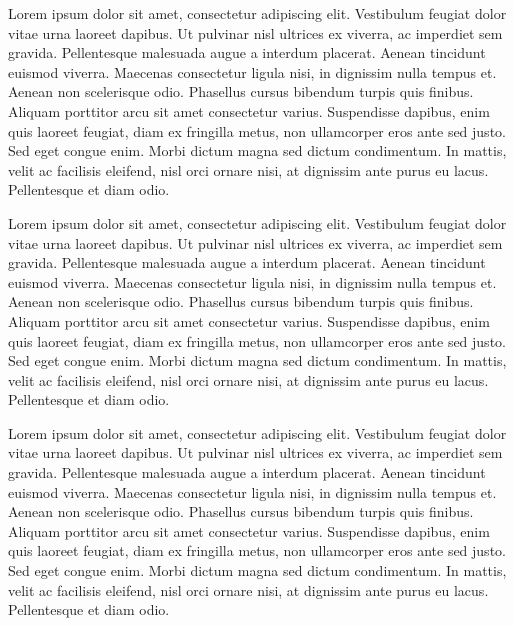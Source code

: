 \documentclass{article}
\begin{document}
\begin{pairs}  
  

\begin{Leftside} 
\resumenumbering  
\pstart  

Lorem ipsum dolor sit amet, consectetur adipiscing elit. Vestibulum feugiat dolor vitae urna laoreet dapibus. Ut pulvinar nisl ultrices ex viverra, ac imperdiet sem gravida. Pellentesque malesuada augue a interdum placerat. Aenean tincidunt euismod viverra. Maecenas consectetur ligula nisi, in dignissim nulla tempus et. Aenean non scelerisque odio. Phasellus cursus bibendum turpis quis finibus. Aliquam porttitor arcu sit amet consectetur varius. Suspendisse dapibus, enim quis laoreet feugiat, diam ex fringilla metus, non ullamcorper eros ante sed justo. Sed eget congue enim. Morbi dictum magna sed dictum condimentum. In mattis, velit ac facilisis eleifend, nisl orci ornare nisi, at dignissim ante purus eu lacus. Pellentesque et diam odio.
\pend  
\pausenumbering 
\end{Leftside}

\begin{Rightside}   
\resumenumbering  
\pstart  
Lorem ipsum dolor sit amet, consectetur adipiscing elit. Vestibulum feugiat dolor vitae urna laoreet dapibus. Ut pulvinar nisl ultrices ex viverra, ac imperdiet sem gravida. Pellentesque malesuada augue a interdum placerat. Aenean tincidunt euismod viverra. Maecenas consectetur ligula nisi, in dignissim nulla tempus et. Aenean non scelerisque odio. Phasellus cursus bibendum turpis quis finibus. Aliquam porttitor arcu sit amet consectetur varius. Suspendisse dapibus, enim quis laoreet feugiat, diam ex fringilla metus, non ullamcorper eros ante sed justo. Sed eget congue enim. Morbi dictum magna sed dictum condimentum. In mattis, velit ac facilisis eleifend, nisl orci ornare nisi, at dignissim ante purus eu lacus. Pellentesque et diam odio.
\pend  
\endnumbering
\end{Rightside} 
\end{pairs}  

\Columns
\resumenumbering  
\pstart  
Lorem ipsum dolor sit amet, consectetur adipiscing elit. Vestibulum feugiat dolor vitae urna laoreet dapibus. Ut pulvinar nisl ultrices ex viverra, ac imperdiet sem gravida. Pellentesque malesuada augue a interdum placerat. Aenean tincidunt euismod viverra. Maecenas consectetur ligula nisi, in dignissim nulla tempus et. Aenean non scelerisque odio. Phasellus cursus bibendum turpis quis finibus. Aliquam porttitor arcu sit amet consectetur varius. Suspendisse dapibus, enim quis laoreet feugiat, diam ex fringilla metus, non ullamcorper eros ante sed justo. Sed eget congue enim. Morbi dictum magna sed dictum condimentum. In mattis, velit ac facilisis eleifend, nisl orci ornare nisi, at dignissim ante purus eu lacus. Pellentesque et diam odio.
\pend  
\endnumbering
\end{document}
